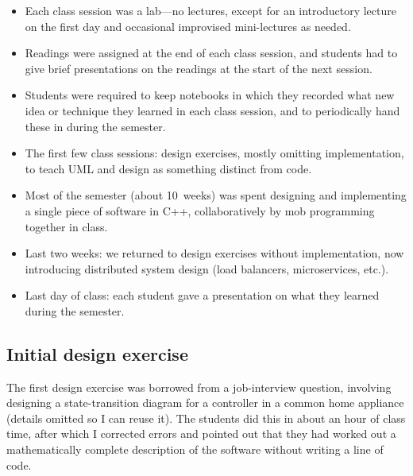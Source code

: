 \documentclass{article}
\begin{document}
\begin{itemize}
\item Each class session was a lab---no lectures, except for an introductory
lecture on the first day and occasional improvised mini-lectures as needed.

\item Readings were assigned at the end of each class session, and students
had to give brief presentations on the readings at the start of the next
session.

\item Students were required to keep notebooks in which they recorded what new
idea or technique they learned in each class session, and to periodically hand
these in during the semester.

\item The first few class sessions: design exercises, mostly omitting
implementation, to teach UML and design as something distinct from code.

\item Most of the semester (about 10~weeks) was spent designing and
implementing a single piece of software in C++, collaboratively by mob
programming together in class.

\item Last two weeks: we returned to design exercises without implementation,
now introducing distributed system design (load balancers, microservices,
etc.).


\item Last day of class: each student gave a presentation on what they learned
during the semester.
\end{itemize}

\subsection{Initial design exercise}

The first design exercise was borrowed from a job-interview question,
involving designing a state-transition diagram for a controller in a common
home appliance (details omitted so I can reuse it). The students did this in
about an hour of class time, after which I corrected errors and pointed out
that they had worked out a mathematically complete description of the software
without writing a line of code.
\end{document}
